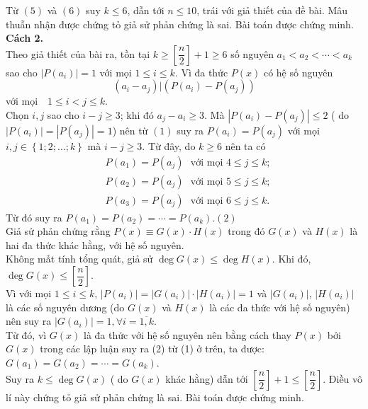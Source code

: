 \begin{bt}
{Từ $(5)$ và $(6)$ suy $k \le 6$, dẫn tới $n \le 10$, trái với giả thiết của đề bài. Mâu thuẫn nhận được chứng tỏ giả sử phản chứng là sai. Bài toán được chứng minh.\\
\textbf{Cách 2.}\\
 Theo giả thiết của bài ra, tồn tại $k \ge \left[ \dfrac{n}{2} \right] + 1 \ge 6$ số nguyên $a_1 < a_2 < \cdots < a_k$ sao cho $| P(a_i)| = 1$ với mọi $1 \le i \le k$. 
 Vì đa thức $P(x)$ có hệ số nguyên 
 \[(a_i - a_j) \Big|(P(a_i) - P(a_j)) \tag{1}\]với mọi$\quad 1 \le i < j \le k.$\\
Chọn $i,j$ sao cho $i - j \ge 3$; khi đó $a_j - a_i \ge 3$. Mà $| P(a_i) - P(a_j)| \le 2$ ( do $| P(a_i)| =| P(a_j)| = 1$) nên từ $(1)$ suy ra $P(a_i) = P(a_j)$ với mọi 
$i,j \in \left\{ {1;2;\ldots;k} \right\}$ mà $i - j \ge 3$. Từ đây, do $k \ge 6$ nên ta có {\allowdisplaybreaks
\begin{align*}
&P(a_1) = P(a_j)\,\, \text{ với mọi} \,\, 4 \le j \le k;\\
&P(a_2) = P(a_j)\,\, \text{ với mọi} \,\, 5 \le j \le k;\\
&P(a_3) = P(a_j)\,\,  \text{ với mọi} \,\, 6 \le j \le k.
\end{align*}}Từ đó suy ra $P(a_1) = P(a_2) = \cdots = P(a_k).$\hfill $(2)$\\
Giả sử phản chứng rằng $P(x) \equiv G(x)\cdot H(x)$ trong đó $G(x)$ và $H(x)$  là hai đa thức khác hằng, với hệ số nguyên.\\
Không mất tính tổng quát, giả sử $\deg G(x) \le \deg H(x)$. Khi đó, $\deg G(x) \le \left[ \dfrac{n}{2} \right]$.\\
Vì với mọi $1 \le i \le k$, $| P(a_i)| = | G(a_i)|\cdot| H(a_i)| = 1$ và $| G(a_i)|$, $| H(a_i)|$ là các số nguyên dương (do $G(x)$ và $H(x)$ là các đa thức với hệ số nguyên) 
nên suy ra $| G(a_i)| = 1,\forall i = \overline {1,k} $. \\
Từ đó, vì $G(x)$  là đa thức với hệ số nguyên nên bằng cách thay $P(x)$  bởi $G(x)$  trong các lập luận suy ra (2) từ (1) ở trên, ta được: 
$G(a_1) = G(a_2) = \cdots = G(a_k)$.\\
Suy ra $k \le \deg G(x)$ ( do $G(x)$   khác hằng) dẫn tới $\left[ \dfrac{n}{2} \right] + 1 \le \left[ \dfrac{n}{2} \right]$. Điều vô lí này chứng tỏ giả sử phản chứng là sai. Bài toán được chứng minh.
}
\end{bt}


